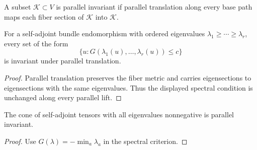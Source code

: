 \begin{definition}
\label{def:chow-ii-parallel-invariant-set}

A subset $\mathcal K\subset V$ is parallel invariant if parallel translation along
every base path maps each fiber section of $\mathcal K$ into $\mathcal K$.
\end{definition}

\begin{lemma}
\label{lem:chow-ii-spectral-invariance}


For a self-adjoint bundle endomorphism with ordered eigenvalues
$\lambda_1\ge\cdots\ge\lambda_r$, every set of the form
\[
\{u:G(\lambda_1(u),\ldots,\lambda_r(u))\le c\}
\]
is invariant under parallel translation.
\end{lemma}
\begin{proof}
\sketch
Parallel translation preserves the fiber metric and carries eigensections to
eigensections with the same eigenvalues.  Thus the displayed spectral condition
is unchanged along every parallel lift.
\end{proof}

\begin{corollary}
\label{cor:chow-ii-nonnegative-tensor-cone}


The cone of self-adjoint tensors with all eigenvalues nonnegative is parallel
invariant.
\end{corollary}
\begin{proof}
\sketch
{}
Use $G(\lambda)=-\min_a\lambda_a$ in the spectral criterion.
\end{proof}

